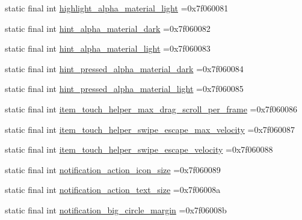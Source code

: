 \begin{DoxyCompactItemize}
\item 
static final int \mbox{\hyperlink{classcom_1_1example_1_1trainawearapplication_1_1_r_1_1dimen_ae6f2270f9579fba1cd86a8dfc440c5c6}{highlight\+\_\+alpha\+\_\+material\+\_\+light}} =0x7f060081
\item 
static final int \mbox{\hyperlink{classcom_1_1example_1_1trainawearapplication_1_1_r_1_1dimen_ad5afe3ec7c61aa5cf4b9aeaa779cc3b8}{hint\+\_\+alpha\+\_\+material\+\_\+dark}} =0x7f060082
\item 
static final int \mbox{\hyperlink{classcom_1_1example_1_1trainawearapplication_1_1_r_1_1dimen_a610c45aa253f76438a06cf031099a07c}{hint\+\_\+alpha\+\_\+material\+\_\+light}} =0x7f060083
\item 
static final int \mbox{\hyperlink{classcom_1_1example_1_1trainawearapplication_1_1_r_1_1dimen_a107de421cece375fdcf024f09ac63739}{hint\+\_\+pressed\+\_\+alpha\+\_\+material\+\_\+dark}} =0x7f060084
\item 
static final int \mbox{\hyperlink{classcom_1_1example_1_1trainawearapplication_1_1_r_1_1dimen_a76a086f3fb0081860451e32024e2fc3f}{hint\+\_\+pressed\+\_\+alpha\+\_\+material\+\_\+light}} =0x7f060085
\item 
static final int \mbox{\hyperlink{classcom_1_1example_1_1trainawearapplication_1_1_r_1_1dimen_a6be43c994035a4423a7a3f46ca7971dc}{item\+\_\+touch\+\_\+helper\+\_\+max\+\_\+drag\+\_\+scroll\+\_\+per\+\_\+frame}} =0x7f060086
\item 
static final int \mbox{\hyperlink{classcom_1_1example_1_1trainawearapplication_1_1_r_1_1dimen_a11ac229789a316f0460f2bcdae41c241}{item\+\_\+touch\+\_\+helper\+\_\+swipe\+\_\+escape\+\_\+max\+\_\+velocity}} =0x7f060087
\item 
static final int \mbox{\hyperlink{classcom_1_1example_1_1trainawearapplication_1_1_r_1_1dimen_a17246f154c9ef7784c04e694b4566213}{item\+\_\+touch\+\_\+helper\+\_\+swipe\+\_\+escape\+\_\+velocity}} =0x7f060088
\item 
static final int \mbox{\hyperlink{classcom_1_1example_1_1trainawearapplication_1_1_r_1_1dimen_a728773a57712beaa646a941718797fb9}{notification\+\_\+action\+\_\+icon\+\_\+size}} =0x7f060089
\item 
static final int \mbox{\hyperlink{classcom_1_1example_1_1trainawearapplication_1_1_r_1_1dimen_aacc8acf114ced7f70b96bf42d7bdac73}{notification\+\_\+action\+\_\+text\+\_\+size}} =0x7f06008a
\item 
static final int \mbox{\hyperlink{classcom_1_1example_1_1trainawearapplication_1_1_r_1_1dimen_a7a65e01ff3192940efe5ffa3b31f70b9}{notification\+\_\+big\+\_\+circle\+\_\+margin}} =0x7f06008b

\end{DoxyCompactItemize}
